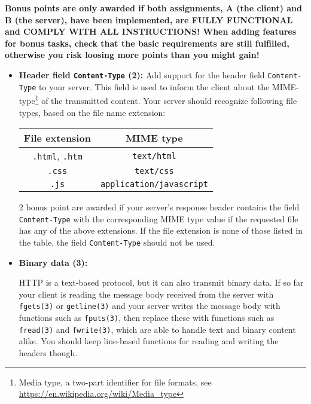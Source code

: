 \vspace{-3mm}
\textbf{Bonus points are only awarded if both assignments,
 A (the client) and B (the server),
have been implemented, are FULLY FUNCTIONAL
and COMPLY WITH ALL INSTRUCTIONS!
When adding features for bonus tasks,
check that the basic requirements are still fulfilled,
otherwise you risk loosing more points than you might gain!
}


\begin{itemize}

\item \textbf{Header field \texttt{Content-Type} (2):}
Add support for the header field \verb|Content-Type| to your server.
This field is used to inform the client about the MIME-type\footnote{
Media type, a two-part identifier for file formats,
see \url{https://en.wikipedia.org/wiki/Media_type}}
of the transmitted content.
Your server should recognize following file types,
based on the file name extension:

\begin{center}
\begin{tabular}{c c}
\textbf{File extension} & \textbf{MIME type} \\
\hline
\verb|.html|, \verb|.htm| & \verb|text/html| \\
\verb|.css| & \verb|text/css| \\
\verb|.js| & \verb|application/javascript| \\
\end{tabular}
\end{center}

2 bonus point are awarded if your server's response header
contains the field \verb|Content-Type| with the corresponding MIME type value
if the requested file has any of the above extensions.
If the file extension is none of those listed in the table,
the field \verb|Content-Type| should not be used.


\item \textbf{Binary data (3):}

HTTP is a text-based protocol, but it can also transmit binary data.
If so far your client is reading the message body received from the server
with \verb|fgets(3)| or \verb|getline(3)|
and your server writes the message body with functions such as \verb|fputs(3)|,
then replace these with functions such as \verb|fread(3)| and \verb|fwrite(3)|,
which are able to handle text and binary content alike.
You should keep line-based functions for reading and writing the headers though.


\end{itemize}

